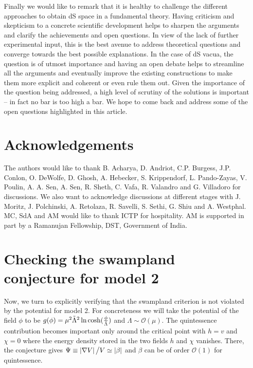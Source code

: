 \documentclass[11pt,a4paper]{article}
\newcommand{\mc}{\mathcal}
\begin{document}
\begin{itemize}
Finally we would like to remark that it is healthy to challenge the different approaches to obtain dS space in a fundamental theory. Having criticism and skepticism to a concrete scientific development helps to sharpen the arguments and clarify the achievements and open questions. In view of the lack of further experimental input, this is the best avenue to address theoretical questions and converge towards the best possible explanations. In the case of dS vacua, the question is of utmost importance and  having an open debate helps to streamline all the arguments and eventually improve the existing constructions to make them more explicit and coherent or even rule them out. Given the importance of the question being addressed, a high level of scrutiny of the solutions is important -- in fact no bar is too high a bar. We hope to come back and address some of the open questions highlighted in this article.


\section*{Acknowledgements}

The authors would like to thank B. Acharya, D. Andriot, C.P. Burgess, J.P. Conlon, O. DeWolfe, D. Ghosh, A. Hebecker, S. Krippendorf, L. Pando-Zayas, V. Poulin, A. A. Sen, A. Sen, R. Sheth, C. Vafa, R. Valandro and G. Villadoro for discussions. We also want to acknowledge discussions at different stages with  J. Moritz,  J. Polchinski, A. Retolaza,  R. Savelli, S. Sethi, G. Shiu and A. Westphal. MC, SdA and AM would like to thank ICTP for hospitality. AM is supported in part by a Ramanujan Fellowship, DST, Government of India.


\appendix

\appendix

\section{Checking the swampland conjecture for model 2}

Now, we turn to explicitly verifying that the swampland criterion is not violated by the potential for model 2. For concreteness we will take the potential of the field $\phi$ to be $g(\phi) = \mu^2 \tilde{\Lambda}^2 \ln \cosh ( {\phi  \over \tilde{\Lambda}} )$ and $\Lambda \sim \mathcal{O}(\mu)$. The quintessence contribution becomes important only around the critical point with $h = v$ and $\chi = 0$ where the energy density stored in the two fields $h$ and $\chi$ vanishes. There, the conjecture gives $\Psi \equiv \left|\nabla V\right| \big{/} V  \simeq |\beta|$ and $\beta$ can be of order $\mc{O}(1)$ for quintessence.


\end{itemize}
\end{document}

